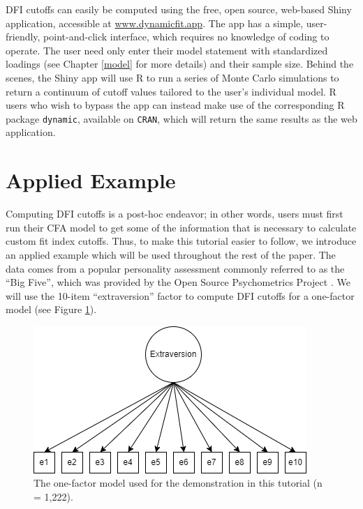 \documentclass[
]{book}
\begin{document}
DFI cutoffs can easily be computed using the free, open source, web-based Shiny application, accessible at \url{www.dynamicfit.app}. The app has a simple, user-friendly, point-and-click interface, which requires no knowledge of coding to operate. The user need only enter their model statement with standardized loadings (see Chapter \ref{model} for more details) and their sample size. Behind the scenes, the Shiny app will use R to run a series of Monte Carlo simulations to return a continuum of cutoff values tailored to the user's individual model. R users who wish to bypass the app can instead make use of the corresponding R package \texttt{dynamic}, available on \texttt{CRAN}, which will return the same results as the web application.

\hypertarget{applied-example}{%
\section{Applied Example}\label{applied-example}}

Computing DFI cutoffs is a post-hoc endeavor; in other words, users must first run their CFA model to get some of the information that is necessary to calculate custom fit index cutoffs. Thus, to make this tutorial easier to follow, we introduce an applied example which will be used throughout the rest of the paper. The data comes from a popular personality assessment commonly referred to as the ``Big Five'', which was provided by the Open Source Psychometrics Project \citep{goldberg_development_1992}. We will use the 10-item ``extraversion'' factor to compute DFI cutoffs for a one-factor model (see Figure \ref{fig:extraversion}).

\begin{figure}

{\centering \includegraphics{extraversion path diagram} 

}

\caption{The one-factor model used for the demonstration in this tutorial (n = 1,222).}\label{fig:extraversion}
\end{figure}
\end{document}
